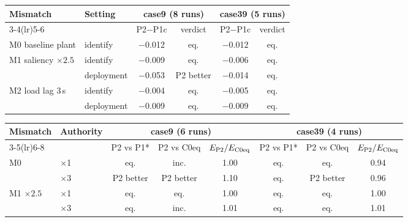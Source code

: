 \begin{tabular}{llcccc}
\toprule
Mismatch & Setting & \multicolumn{2}{c}{case9 (8 runs)} & \multicolumn{2}{c}{case39 (5 runs)}\\
\cmidrule(lr){3-4}\cmidrule(lr){5-6}
 & & P2$-$P1c & verdict & P2$-$P1c & verdict\\
\midrule
M0 baseline plant & identify & $-$0.012 & eq. & $-$0.012 & eq.\\
M1 saliency $\times2.5$ & identify & $-$0.009 & eq. & $-$0.006 & eq.\\
 & deployment & $-$0.053 & P2 better & $-$0.014 & eq.\\
M2 load lag $3$\,s & identify & $-$0.004 & eq. & $-$0.005 & eq.\\
 & deployment & $-$0.009 & eq. & $-$0.009 & eq.\\
\bottomrule
\end{tabular}
\begin{tabular}{llcccccc}
\toprule
Mismatch & Authority & \multicolumn{3}{c}{case9 (6 runs)} & \multicolumn{3}{c}{case39 (4 runs)}\\
\cmidrule(lr){3-5}\cmidrule(lr){6-8}
 & & P2 vs P1* & P2 vs C0eq & $E_{\rm P2}/E_{\rm C0eq}$ & P2 vs P1* & P2 vs C0eq & $E_{\rm P2}/E_{\rm C0eq}$\\
\midrule
M0 & $\times$1 & eq. & inc. & 1.00 & eq. & eq. & 0.94\\
 & $\times$3 & P2 better & P2 better & 1.10 & eq. & P2 better & 0.96\\
M1 $\times2.5$ & $\times$1 & eq. & eq. & 1.00 & eq. & eq. & 1.00\\
 & $\times$3 & eq. & inc. & 1.01 & eq. & eq. & 1.01\\
\bottomrule
\end{tabular}
